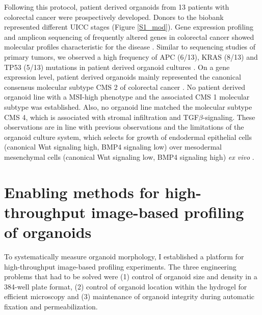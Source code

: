 \begin{flushleft}
Following this protocol, patient derived organoids from 13 patients with colorectal cancer were prospectively developed. Donors to the biobank represented different UICC stages (Figure \ref{S1_mod}). Gene expression profiling and amplicon sequencing of frequently altered genes in colorectal cancer showed molecular profiles characteristic for the disease . Similar to sequencing studies of primary tumors, we observed a high frequency of APC (6/13), KRAS (8/13) and TP53 (5/13) mutations in patient derived organoid cultures \cite{Muzny2012-hr}. On a gene expression level, patient derived organoids mainly represented the canonical consensus molecular subtype CMS 2 of colorectal cancer \cite{Guinney2015-ex}. No patient derived organoid line with a MSI-high phenotype and the associated CMS 1 molecular subtype was established. Also, no organoid line matched the molecular subtype CMS 4, which is associated with stromal infiltration and TGF\(\beta\)-signaling. These observations are in line with previous observations \cite{Van_De_Wetering2015-ko, Schutte2017-fl} and the limitations of the organoid culture system, which selects for growth of  endodermal epithelial cells (canonical Wnt signaling high, BMP4 signaling low) over mesodermal mesenchymal cells (canonical Wnt signaling low, BMP4 signaling high) \textit{ex vivo} \cite{Sato2011-lh}.

\section{Enabling methods for high-throughput image-based profiling of organoids}
To systematically measure organoid morphology, I established a platform for high-throughput image-based profiling experiments. The three engineering problems that had to be solved were (1) control of organoid size and density in a 384-well plate format, (2) control of organoid location within the hydrogel for efficient microscopy and (3) maintenance of organoid integrity during automatic fixation and permeabilization. 


\end{flushleft}
